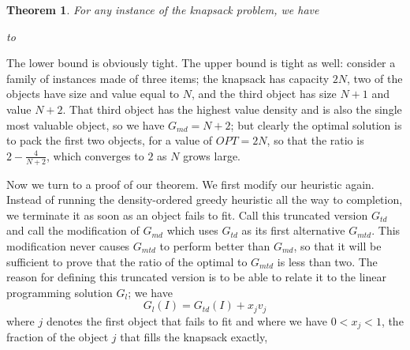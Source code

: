 \documentclass[11pt]{article}
\newtheorem{theorem}{Theorem}
\begin{document}
\begin{theorem}
  For any instance of the knapsack problem, we have

 \hbox to
\end{theorem}
The lower bound is obviously tight.  The upper bound is tight as well: consider
a family of instances made of three items; the knapsack has capacity $2N$,
two of the objects have size and value equal to $N$, and the third object
has size $N+1$ and value $N+2$.   That third object has the highest value
density and is also the single most valuable object, so we have $G_{md}=N+2$;
but clearly the optimal solution is to pack the first two objects, for a
value of $OPT = 2N$, so that the ratio is $2-\frac{4}{N+2}$, which converges
to $2$ as $N$ grows large.

Now we turn to a proof of our theorem.
We first modify our heuristic again.  Instead of running the density-ordered
greedy heuristic all the way to completion, we terminate it as soon as an
object fails to fit.  Call this truncated version $G_{td}$ and call the
modification of $G_{md}$ which uses $G_{td}$ as its first alternative
$G_{mtd}$.  This modification never causes $G_{mtd}$ to perform better
than $G_{md}$, so that it will be sufficient to prove that the ratio of
the optimal to $G_{mtd}$ is less than two.  The reason for defining this
truncated version is to be able to relate it to the linear programming
solution $G_l$; we have
\begin{displaymath}
  G_l(I) = G_{td}(I) + x_j v_j
\end{displaymath}
where $j$ denotes the first object that fails to fit and where we have
$0<x_j<1$, the fraction of the object $j$ that fills the knapsack exactly,
  
\end{document}
